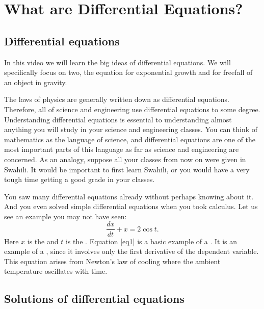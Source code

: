 \sectionnewpage
\section{What are Differential Equations?}
\label{introde:section}


\subsection{Differential equations}

\begin{video}
    In this video we will learn the big ideas of differential equations. We will specifically focus on two, the equation for exponential growth and for freefall of an object in gravity.   
\end{video}

The laws of physics are generally written down as differential
equations.  Therefore, all of science and engineering use
differential equations to some degree.  Understanding
differential equations is essential to understanding almost anything you will
study in your science and engineering classes.
You can think of mathematics as the language of science, and
differential equations are one of the most important parts of this
language as far as science and engineering are concerned.  As an analogy,
suppose all your classes from now on were given in Swahili.  
It would be important to first learn Swahili, or you would have a very
tough time getting a good grade in your classes.



You saw many
differential equations already without perhaps knowing about it.
And you even solved simple
differential equations when you took calculus.
Let us see an example you may not have seen:
\begin{equation} \label{eq1}
\frac{dx}{dt} + x = 2 \cos t .
\end{equation}
Here $x$ is the \emph{} and $t$ is the
\emph{}.
Equation \eqref{eq1}
is a basic example of a \emph{}.  It
is an example of a \emph{}, since
it involves only the first derivative of the dependent variable.  This 
equation arises from Newton's law of cooling where the ambient
temperature oscillates with time.

\subsection{Solutions of differential equations}

